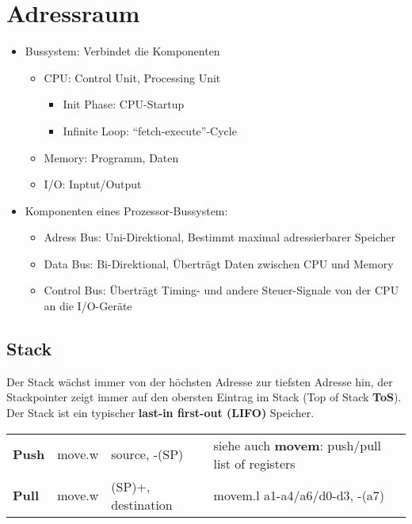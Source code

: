 \section{Adressraum}
\begin{itemize}
  \item Bussystem: Verbindet die Komponenten
  	\begin{itemize}
  		\item CPU: Control Unit, Processing Unit
  			\begin{itemize}
  				\item Init Phase: CPU-Startup
  				\item Infinite Loop: "`fetch-execute"'-Cycle
			\end{itemize}
  		\item Memory: Programm, Daten
  		\item I/O: Inptut/Output
	\end{itemize}
  \item Komponenten eines Prozessor-Bussystem:
  	\begin{itemize}
  		\item Adress Bus: Uni-Direktional, Bestimmt maximal adressierbarer Speicher
  		\item Data Bus: Bi-Direktional, Überträgt Daten zwischen CPU und Memory
  		\item Control Bus: Überträgt Timing- und andere Steuer-Signale von der CPU an die I/O-Geräte
	\end{itemize}
\end{itemize}

\subsection{Stack}
Der Stack wächst immer von der höchsten Adresse zur tiefsten Adresse hin, der Stackpointer zeigt immer auf den obersten Eintrag im Stack (Top of Stack \textbf{ToS}).
Der Stack ist ein typischer \textbf{last-in first-out (LIFO)} Speicher. \\
\begin{tabular}{lll|l}
	\textbf{Push}	& move.w	& source, -(SP)			& siehe auch \textbf{movem}: push/pull list of registers \\
	\textbf{Pull}	& move.w	& (SP)+, destination	& movem.l \quad a1-a4/a6/d0-d3, -(a7)
\end{tabular}

